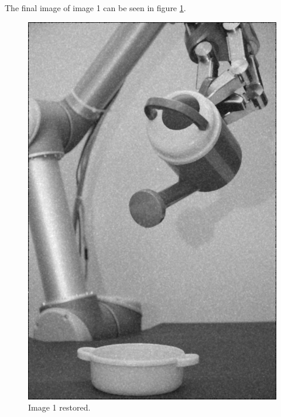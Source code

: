 The final image of image 1 can be seen in figure \ref{fig:final_image1}.

\begin{figure}[H]
\centering
\includegraphics[width = 0.8 \linewidth]{../code/images/image_result_1.png}
\caption{Image 1 restored.}
\label{fig:final_image1}
\end{figure}
